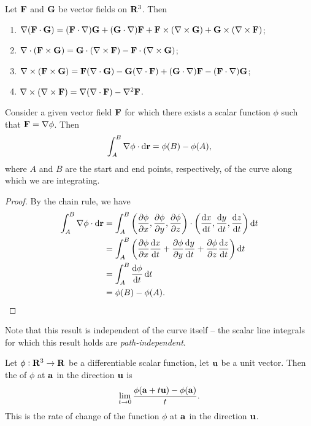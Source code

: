 \begin{proposition}
Let $\vb{F}$ and $\vb{G}$ be vector fields on $\mathbf R^3$. Then
\begin{enumerate}[label=(\roman*)]
\item $\nabla(\vb{F}\cdot\vb{G})=(\vb{F}\cdot\nabla)\vb{G}+(\vb{G}\cdot\nabla)\vb{F}+\vb{F}\times(\nabla\times\vb{G})+\vb{G}\times(\nabla\times\vb{F})$;
\item $\nabla\cdot(\vb{F}\times\vb{G})=\vb{G}\cdot(\nabla\times\vb{F})-\vb{F}\cdot(\nabla\times\vb{G})$;
\item $\nabla\times(\vb{F}\times\vb{G})=\vb{F}(\nabla\cdot\vb{G})-\vb{G}(\nabla\cdot\vb{F})+(\vb{G}\cdot\nabla)\vb{F}-(\vb{F}\cdot\nabla)\vb{G}$;
\item $\nabla\times(\nabla\times\vb{F})=\nabla(\nabla\cdot\vb{F})-\nabla^2\vb{F}$.
\end{enumerate}
\end{proposition}

\begin{proposition}
Consider a given vector field $\vb{F}$ for which there exists a scalar function $\phi$ such that $\vb{F}=\nabla\phi$. Then
\begin{equation}
\int_{A}^{B}\nabla\phi\cdot\dd{\vb{r}}=\phi(B)-\phi(A),
\end{equation}
where $A$ and $B$ are the start and end points, respectively, of the curve along which we are integrating.
\end{proposition}

\begin{proof}
By the chain rule, we have
\begin{align*}
\int_{A}^{B}\nabla\phi\cdot\dd{\vb{r}}
&=\int_{A}^{B}\left(\pdv{\phi}{x},\pdv{\phi}{y},\pdv{\phi}{z}\right)\cdot\left(\dv{x}{t},\dv{y}{t},\dv{z}{t}\right)\dd{t}\\
&=\int_{A}^{B}\left(\pdv{\phi}{x}\dv{x}{t}+\pdv{\phi}{y}\dv{y}{t}+\pdv{\phi}{z}\dv{z}{t}\right)\dd{t}\\
&=\int_{A}^{B}\dv{\phi}{t}\dd{t}\\
&=\phi(B)-\phi(A).
\end{align*}
\end{proof}

\begin{remark}
Note that this result is independent of the curve itself -- the scalar line integrals for which this result holds are \emph{path-independent}.
\end{remark}

\begin{definition}
Let $\phi:\mathbf R^3\to\mathbf R$ be a differentiable scalar function, let $\vb{u}$ be a unit vector. Then the  of $\phi$ at $\vb{a}$ in the direction $\vb{u}$ is
\[\lim_{t\to0}\frac{\phi(\vb{a}+t\vb{u})-\phi(\vb{a})}{t}.\]
This is the rate of change of the function $\phi$ at $\vb{a}$ in the direction $\vb{u}$.
\end{definition}

